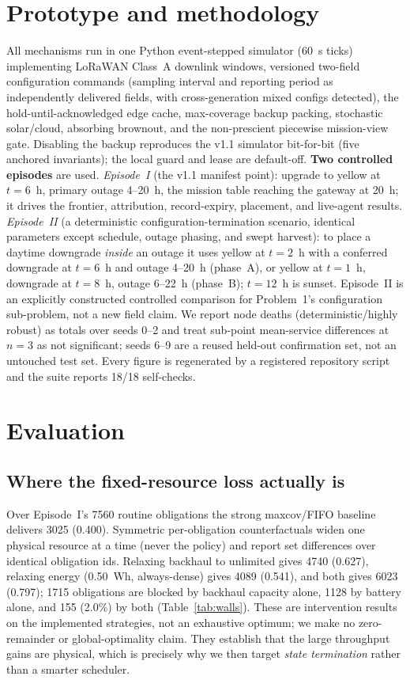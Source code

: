 \documentclass[11pt]{article}
\begin{document}
\section{Prototype and methodology}
\label{sec:proto}
All mechanisms run in one Python event-stepped simulator (60~s ticks) implementing LoRaWAN Class~A
downlink windows, versioned two-field configuration commands (sampling interval and reporting
period as independently delivered fields, with cross-generation mixed configs detected), the
hold-until-acknowledged edge cache, max-coverage backup packing, stochastic solar/cloud, absorbing
brownout, and the non-prescient piecewise mission-view gate. Disabling the backup reproduces the
v1.1 simulator bit-for-bit (five anchored invariants); the local guard and lease are default-off.
\textbf{Two controlled episodes} are used. \emph{Episode~I} (the v1.1 manifest point): upgrade to
yellow at $t{=}6$~h, primary outage 4--20~h, the mission table reaching the gateway at 20~h; it
drives the frontier, attribution, record-expiry, placement, and live-agent results. \emph{Episode~II}
(a deterministic configuration-termination scenario, identical parameters except schedule,
outage phasing, and swept harvest): to place a daytime downgrade \emph{inside} an outage it uses
yellow at $t{=}2$~h with a conferred downgrade at $t{=}6$~h and outage 4--20~h (phase~A), or yellow
at $t{=}1$~h, downgrade at $t{=}8$~h, outage 6--22~h (phase~B); $t{=}12$~h is sunset. Episode~II is
an explicitly constructed controlled comparison for Problem~1's configuration sub-problem, not a
new field claim. We report node deaths (deterministic/highly robust) as totals over seeds 0--2 and
treat sub-point mean-service differences at $n{=}3$ as not significant; seeds 6--9 are a reused
held-out confirmation set, not an untouched test set. Every figure is regenerated by a registered
repository script and the suite reports 18/18 self-checks.

\section{Evaluation}
\label{sec:eval}

\subsection{Where the fixed-resource loss actually is}
\label{sec:eval-frontier}
Over Episode~I's 7560 routine obligations the strong maxcov/FIFO baseline delivers 3025 (0.400).
Symmetric per-obligation counterfactuals widen one physical resource at a time (never the policy)
and report set differences over identical obligation ids. Relaxing backhaul to unlimited gives
4740 (0.627), relaxing energy (0.50~Wh, always-dense) gives 4089 (0.541), and both gives 6023
(0.797); 1715 obligations are blocked by backhaul capacity alone, 1128 by battery alone, and 155
(2.0\%) by both (Table~\ref{tab:walls}). These are intervention results on the implemented
strategies, not an exhaustive optimum; we make no zero-remainder or global-optimality claim. They
establish that the large throughput gains are physical, which is precisely why we then target
\emph{state termination} rather than a smarter scheduler.
\end{document}
